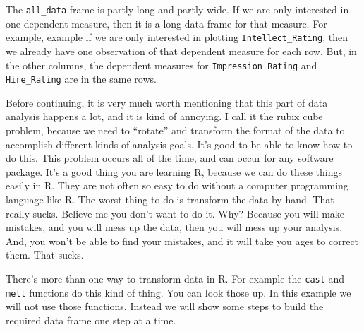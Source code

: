 \documentclass[
]{book}
\begin{document}
The \texttt{all\_data} frame is partly long and partly wide. If we are only interested in one dependent measure, then it is a long data frame for that measure. For example, example if we are only interested in plotting \texttt{Intellect\_Rating}, then we already have one observation of that dependent measure for each row. But, in the other columns, the dependent measures for \texttt{Impression\_Rating} and \texttt{Hire\_Rating} are in the same rows.

Before continuing, it is very much worth mentioning that this part of data analysis happens a lot, and it is kind of annoying. I call it the rubix cube problem, because we need to ``rotate'' and transform the format of the data to accomplish different kinds of analysis goals. It's good to be able to know how to do this. This problem occurs all of the time, and can occur for any software package. It's a good thing you are learning R, because we can do these things easily in R. They are not often so easy to do without a computer programming language like R. The worst thing to do is transform the data by hand. That really sucks. Believe me you don't want to do it. Why? Because you will make mistakes, and you will mess up the data, then you will mess up your analysis. And, you won't be able to find your mistakes, and it will take you ages to correct them. That sucks.

There's more than one way to transform data in R. For example the \texttt{cast} and \texttt{melt} functions do this kind of thing. You can look those up. In this example we will not use those functions. Instead we will show some steps to build the required data frame one step at a time.
\end{document}
